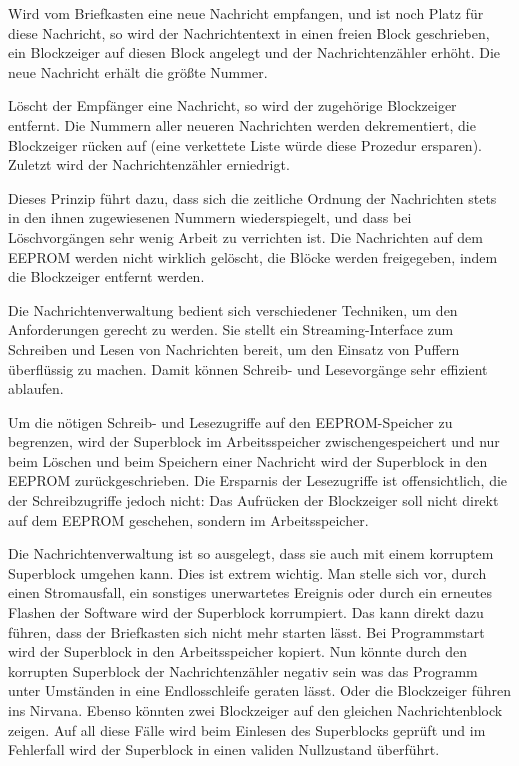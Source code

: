 \documentclass[ngerman]{article}
\begin{document}
Wird vom Briefkasten eine neue Nachricht  empfangen, und ist noch Platz für
diese Nachricht, so wird der Nachrichtentext in einen freien Block geschrieben,
ein Blockzeiger auf diesen Block angelegt und der Nachrichtenzähler erhöht. Die
neue Nachricht erhält die größte Nummer. 

Löscht der Empfänger eine Nachricht, so wird der zugehörige Blockzeiger
entfernt. Die Nummern aller neueren Nachrichten werden dekrementiert, die
Blockzeiger rücken auf (eine verkettete Liste würde diese Prozedur ersparen).
Zuletzt wird der Nachrichtenzähler erniedrigt.

Dieses Prinzip führt dazu, dass sich die zeitliche Ordnung der Nachrichten
stets in den ihnen zugewiesenen Nummern wiederspiegelt, und dass bei
Löschvorgängen sehr wenig Arbeit zu verrichten ist. Die Nachrichten auf dem
EEPROM werden nicht wirklich gelöscht, die Blöcke werden freigegeben, indem die
Blockzeiger entfernt werden.

Die Nachrichtenverwaltung bedient sich verschiedener Techniken, um den
Anforderungen gerecht zu werden. Sie stellt ein Streaming-Interface zum
Schreiben und Lesen von Nachrichten bereit, um den Einsatz von Puffern
überflüssig zu machen. Damit können Schreib- und Lesevorgänge sehr effizient
ablaufen.

Um die nötigen Schreib- und Lesezugriffe auf den EEPROM-Speicher zu begrenzen,
wird der Superblock im Arbeitsspeicher zwischengespeichert und nur beim Löschen
und beim Speichern einer Nachricht wird der Superblock in den EEPROM
zurückgeschrieben. Die Ersparnis der Lesezugriffe ist offensichtlich, die der
Schreibzugriffe jedoch nicht: Das Aufrücken der Blockzeiger soll nicht direkt
auf dem EEPROM geschehen, sondern im Arbeitsspeicher.

Die Nachrichtenverwaltung ist so ausgelegt, dass sie auch mit einem korruptem
Superblock umgehen kann. Dies ist extrem wichtig. Man stelle sich vor, durch
einen Stromausfall, ein sonstiges unerwartetes Ereignis oder durch ein erneutes
Flashen der Software wird der Superblock korrumpiert.  Das kann direkt dazu
führen, dass der Briefkasten sich nicht mehr starten lässt. Bei Programmstart
wird der Superblock in den Arbeitsspeicher kopiert.  Nun könnte durch den
korrupten Superblock der Nachrichtenzähler negativ sein was das Programm unter
Umständen in eine Endlosschleife geraten lässt. Oder die Blockzeiger führen ins
Nirvana. Ebenso könnten zwei Blockzeiger auf den gleichen Nachrichtenblock
zeigen. Auf all diese Fälle wird beim Einlesen des Superblocks geprüft und im
Fehlerfall wird der Superblock in einen validen Nullzustand überführt.
\end{document}
